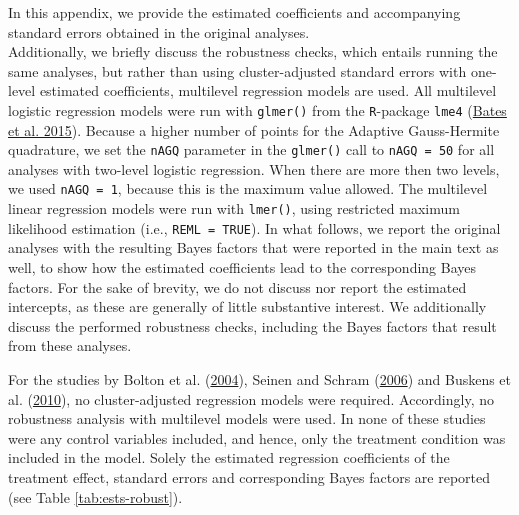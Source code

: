 \documentclass[
  11pt,
]{article}
\begin{document}
In this appendix, we provide the estimated coefficients and accompanying standard errors obtained in the original analyses.\\
Additionally, we briefly discuss the robustness checks, which entails running the same analyses, but rather than using cluster-adjusted standard errors with one-level estimated coefficients, multilevel regression models are used.
All multilevel logistic regression models were run with \texttt{glmer()} from the \texttt{R}-package \texttt{lme4} (\protect\hyperlink{ref-lme4}{Bates et al. 2015}).
Because a higher number of points for the Adaptive Gauss-Hermite quadrature, we set the \texttt{nAGQ} parameter in the \texttt{glmer()} call to \texttt{nAGQ\ =\ 50} for all analyses with two-level logistic regression.
When there are more then two levels, we used \texttt{nAGQ\ =\ 1}, because this is the maximum value allowed.
The multilevel linear regression models were run with \texttt{lmer()}, using restricted maximum likelihood estimation (i.e., \texttt{REML\ =\ TRUE}).
In what follows, we report the original analyses with the resulting Bayes factors that were reported in the main text as well, to show how the estimated coefficients lead to the corresponding Bayes factors.
For the sake of brevity, we do not discuss nor report the estimated intercepts, as these are generally of little substantive interest.
We additionally discuss the performed robustness checks, including the Bayes factors that result from these analyses.

For the studies by Bolton et al. (\protect\hyperlink{ref-bolton_electronic_2004}{2004}), Seinen and Schram (\protect\hyperlink{ref-seinen_schram_social_2006}{2006}) and Buskens et al. (\protect\hyperlink{ref-buskens_raub_veer_triads_2010}{2010}), no cluster-adjusted regression models were required.
Accordingly, no robustness analysis with multilevel models were used.
In none of these studies were any control variables included, and hence, only the treatment condition was included in the model.
Solely the estimated regression coefficients of the treatment effect, standard errors and corresponding Bayes factors are reported (see Table \ref{tab:ests-robust}).
\end{document}
